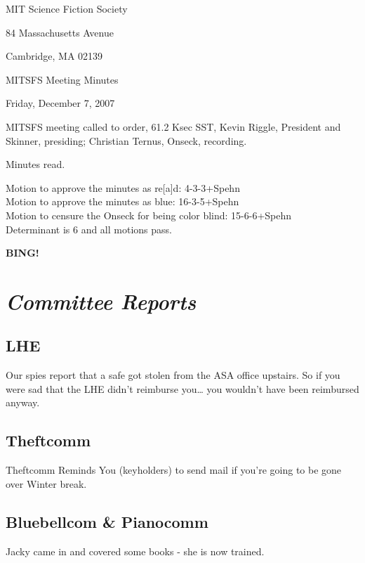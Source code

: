 \documentclass[10pt]{article}
\newcommand{\bing}{{\bf BING!} }
\newcommand{\goto}[1]{\bing \vskip 12pt \section*{{\em{#1}}}}
\begin{document}
\begin{center}

MIT Science Fiction Society

84 Massachusetts Avenue

Cambridge, MA 02139

\vspace{12pt}

MITSFS Meeting Minutes

Friday, December 7, 2007

\end{center}

\vspace{18pt}

\setlength{\parskip}{6pt}

\noindent
MITSFS meeting called to order, 61.2 Ksec SST,
Kevin Riggle, President and Skinner, presiding; Christian Ternus, Onseck, recording.


Minutes read.

Motion to approve the minutes as re[a]d:  4-3-3+Spehn\\
Motion to approve the minutes as blue: 16-3-5+Spehn\\
Motion to censure the Onseck for being color blind: 15-6-6+Spehn\\

Determinant is 6 and all motions pass.

\BING

\goto{Committee Reports}

\subsection*{LHE}

Our spies report that a safe got stolen from the ASA office upstairs.  So if you were sad that the LHE didn't reimburse you\ldots{} you wouldn't have been reimbursed anyway.

\subsection*{Theftcomm}

Theftcomm Reminds You (keyholders) to send mail if you're going to be gone over Winter break.

\subsection*{Bluebellcom \& Pianocomm}

Jacky came in and covered some books - she is now trained.
\end{document}
